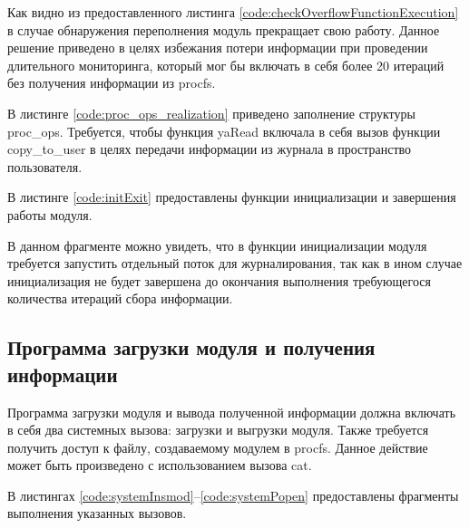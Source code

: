 Как видно из предоставленного листинга \ref{code:checkOverflowFunctionExecution} в случае обнаружения переполнения модуль прекращает свою работу. Данное решение приведено в целях избежания потери информации при проведении длительного мониторинга, который мог бы включать в себя более 20 итераций без получения информации из procfs.

В листинге \ref{code:proc_ops_realization} приведено заполнение структуры proc\_ops. Требуется, чтобы функция yaRead включала в себя вызов функции copy\_to\_user в целях передачи информации из журнала в пространство пользователя.


В листинге \ref{code:initExit} предоставлены функции инициализации и завершения работы модуля.


В данном фрагменте можно увидеть, что в функции инициализации модуля требуется запустить отдельный поток для журналирования, так как в ином случае инициализация не будет завершена до окончания выполнения требующегося количества итераций сбора информации.

\subsection{Программа загрузки модуля и получения информации}
Программа загрузки модуля и вывода полученной информации должна включать в себя два системных вызова: загрузки и выгрузки модуля. Также требуется получить доступ к файлу, создаваемому модулем в procfs. Данное действие может быть произведено с использованием вызова cat.

В листингах \ref{code:systemInsmod}--\ref{code:systemPopen} предоставлены фрагменты выполнения указанных вызовов.

